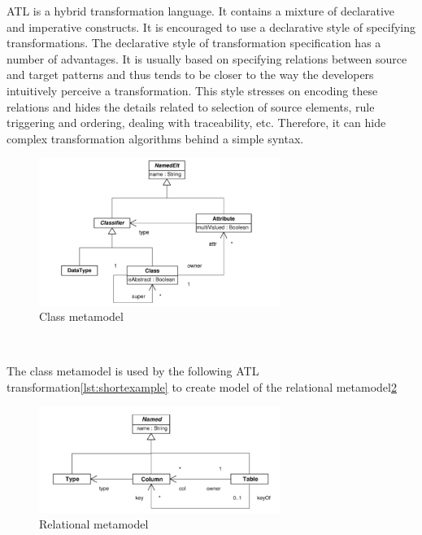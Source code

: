 \documentclass{llncs}
\begin{document}
ATL is a hybrid transformation language. It contains a mixture of declarative
and imperative constructs. It is encouraged to use a declarative style of specifying transformations. The declarative style of transformation specification has a number of advantages. It is usually based on specifying relations between source and target patterns and thus tends to be closer to the way the developers intuitively perceive a transformation. This style stresses on encoding these relations and hides the details related to selection of source elements, rule triggering and ordering, dealing with traceability, etc. Therefore, it can hide complex transformation algorithms behind a simple syntax.\cite{atl:frederic}

\begin{figure}
	\centering
	\includegraphics[width=0.7\textwidth,natwidth=610,natheight=642]{figures/Class_metamodel}
	\caption{Class metamodel}
	\label{fig:class_metamodel_atl}
\end{figure}~

The class metamodel is used by the following ATL transformation\ref{lst:shortexample} to create model of the relational metamodel\ref{fig:relational_metamodel_atl}\cite{atl:frederic}

\begin{figure}
	\centering
	\includegraphics[width=0.7\textwidth,natwidth=610,natheight=642]{figures/Relational_metamodel.jpg}
	\caption{Relational metamodel\cite{atl:frederic}}
	\label{fig:relational_metamodel_atl}
\end{figure}~
\end{document}
